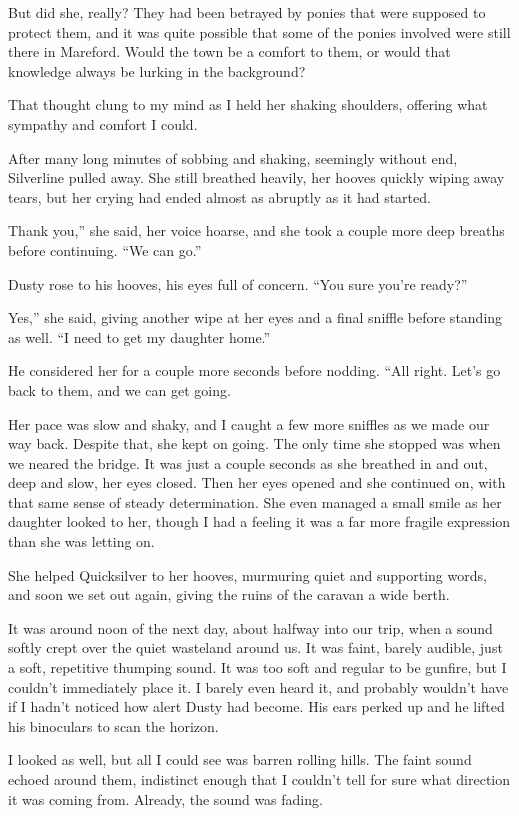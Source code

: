 But did she, really? They had been betrayed by ponies that were supposed to protect them, and it was quite possible that some of the ponies involved were still there in Mareford. Would the town be a comfort to them, or would that knowledge always be lurking in the background?

That thought clung to my mind as I held her shaking shoulders, offering what sympathy and comfort I could.

{\br}%
After many long minutes of sobbing and shaking, seemingly without end, Silverline pulled away. She still breathed heavily, her hooves quickly wiping away tears, but her crying had ended almost as abruptly as it had started.

\leavevmode{}Thank you,” she said, her voice hoarse, and she took a couple more deep breaths before continuing. “We can go.”

Dusty rose to his hooves, his eyes full of concern. “You sure you’re ready?”

\leavevmode{}Yes,” she said, giving another wipe at her eyes and a final sniffle before standing as well. “I need to get my daughter home.”

He considered her for a couple more seconds before nodding. “All right. Let’s go back to them, and we can get going.

Her pace was slow and shaky, and I caught a few more sniffles as we made our way back. Despite that, she kept on going. The only time she stopped was when we neared the bridge. It was just a couple seconds as she breathed in and out, deep and slow, her eyes closed. Then her eyes opened and she continued on, with that same sense of steady determination. She even managed a small smile as her daughter looked to her, though I had a feeling it was a far more fragile expression than she was letting on.

She helped Quicksilver to her hooves, murmuring quiet and supporting words, and soon we set out again, giving the ruins of the caravan a wide berth.

{\br}%
It was around noon of the next day, about halfway into our trip, when a sound softly crept over the quiet wasteland around us. It was faint, barely audible, just a soft, repetitive thumping sound. It was too soft and regular to be gunfire, but I couldn’t immediately place it. I barely even heard it, and probably wouldn’t have if I hadn’t noticed how alert Dusty had become. His ears perked up and he lifted his binoculars to scan the horizon.

I looked as well, but all I could see was barren rolling hills. The faint sound echoed around them, indistinct enough that I couldn’t tell for sure what direction it was coming from. Already, the sound was fading.

